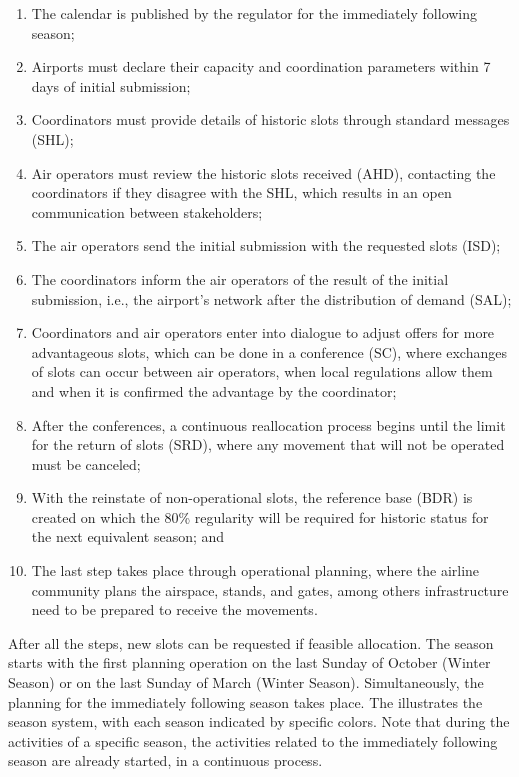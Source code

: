 \begin{enumerate}
    \item The calendar is published by the regulator for the immediately following season;
    \item Airports must declare their capacity and coordination parameters within 7 days of initial submission;
    \item Coordinators must provide details of historic slots through standard messages (\acrshort{SHL});
    \item Air operators must review the historic slots received (\acrshort{AHD}), contacting the coordinators if they disagree with the SHL, which results in an open communication between stakeholders;
    \item The air operators send the initial submission with the requested slots (\acrshort{ISD});
    \item The coordinators inform the air operators of the result of the initial submission, i.e., the airport's network after the distribution of demand (\acrshort{SAL});
    \item Coordinators and air operators enter into dialogue to adjust offers for more advantageous slots, which can be done in a conference (\acrshort{SC}), where exchanges of slots can occur between air operators, when local regulations allow them and when it is confirmed the advantage by the coordinator;
    \item After the conferences, a continuous reallocation process begins until the limit for the return of slots (\acrshort{SRD}), where any movement that will not be operated must be canceled;
    \item With the reinstate of non-operational slots, the reference base (\acrshort{BDR}) is created on which the 80\% regularity will be required for historic status for the next equivalent season; and
    \item The last step takes place through operational planning, where the airline community plans the airspace, stands, and gates, among others infrastructure need to be prepared to receive the movements.
\end{enumerate}

After all the steps, new slots can be requested if feasible allocation. The season starts with the first planning operation on the last Sunday of October (Winter Season) or on the last Sunday of March (Winter Season). Simultaneously, the planning for the immediately following season takes place. The  illustrates the season system, with each season indicated by specific colors. Note that during the activities of a specific season, the activities related to the immediately following season are already started, in a continuous process.

